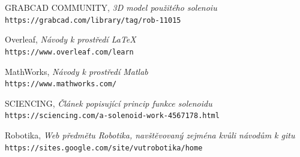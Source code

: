 \documentclass[12pt,oneside]{book} %
\begin{document}
\begin{thebibliography}{9}

GRABCAD COMMUNITY,
\textit{3D model použitého solenoiu}
\\\texttt{https://grabcad.com/library/tag/rob-11015}

Overleaf,
\textit{Návody k prostředí \LaTeX\ }
\\\texttt{https://www.overleaf.com/learn}

MathWorks,
\textit{Návody k prostředí Matlab }
\\\texttt{https://www.mathworks.com/}

SCIENCING,
\textit{Článek popisující princip funkce solenoidu}
\\\texttt{https://sciencing.com/a-solenoid-work-4567178.html}

Robotika,
\textit{Web předmětu Robotika, navštěvovaný zejména kvůli návodům k gitu}
\\\texttt{https://sites.google.com/site/vutrobotika/home}

\end{thebibliography}
\end{document}
